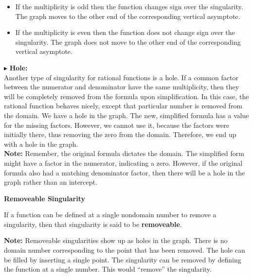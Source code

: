 \documentclass{ximera}
\begin{document}
\begin{itemize}
\item If the multiplicity is odd then the function changes sign over the singularity.  The graph moves to the other end of the corresponding vertical asymptote.
\item If the multiplicity is even then the function does not change sign over the singularity.  The graph does not move to the other end of the corresponding vertical asymptote. 
\end{itemize}




$\blacktriangleright$ \textbf{\textcolor{red!10!blue!90!}{Hole:}} \\
Another type of singularity for rational functions is a hole. If a common factor between the numerator and denominator have the same multiplicity, then they will be completely removed from the formula upon simplification.  In this case, the rational function behaves nicely, except that particular number is removed from the domain.  We have a hole in the graph.  The new, simplified formula has a value for the missing factors.  However, we cannot use it, because the factors were initially there, thus removing the zero from the domain.  Therefore, we end up with a hole in the graph. \\



\textbf{Note:} Remember, the original formula dictates the domain. The simplified form might have a factor in the numerator, indicating a zero. However, if the original formula also had a matching denominator factor, then there will be a hole in the graph rather than an intercept. 






\begin{definition} \textbf{\textcolor{green!50!black}{Removeable Singularity}}

If a function can be defined at a single nondomain number to remove a singularity, then that singularity is said to be \textbf{removeable}.

\end{definition}

\textbf{Note:} Removeable singularities show up as holes in the graph.  There is no domain number corresponding to the point that has been removed. The hole can be filled by inserting a single point.  The singularity can be removed by defining the function at a single number.  This would ``remove'' the singularity. \\
\end{document}
